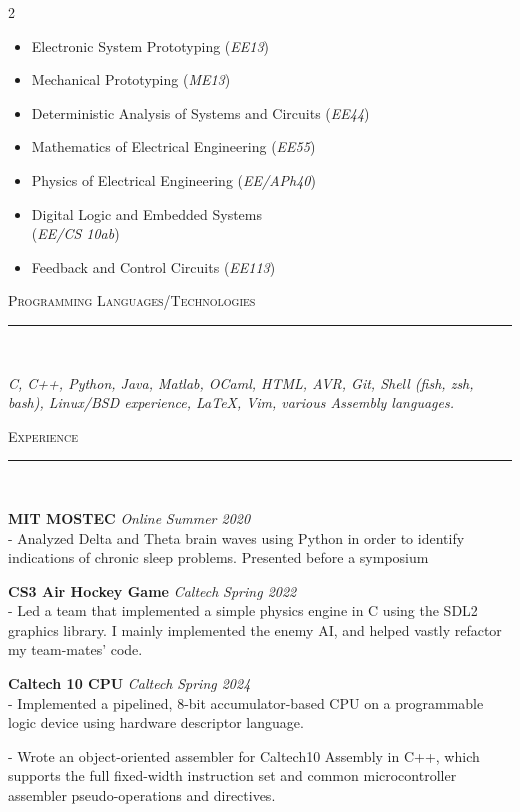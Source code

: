 \documentclass[letterpaper,10pt]{article}
\newcommand{\lineover}{ 
          \begin{changemargin}{-0.05in}{-0.05in} 
                  \vspace*{-8pt} 
                \noindent\rule{\textwidth}{0.4pt} \\ 
                  \vspace*{-2pt} 
        \end{changemargin} 
}
\newenvironment{changemargin}[2]{%
    \begin{list}{}{%
      \setlength{\topsep}{0pt}%
      \setlength{\leftmargin}{0pt}%
      \setlength{\rightmargin}{#2}%
      \setlength{\listparindent}{\parindent}%
      \setlength{\itemindent}{\parindent}%
      \setlength{\parsep}{\parskip}%
    }%
  \item[]}{\end{list} 
}
\newcommand{\header}[1]{ 
          \begin{changemargin}{-0.5in}{-0.5in} 
                  \scshape{#1}\\ 
        \lineover 
        \end{changemargin} 
}
\newcommand{\jobtitle}[4]{ 
          \textbf{#1} \emph{#2} \hfill \emph{#3}\\ 
}
\newcommand{\jobdescription}[1]{ 
          \begin{changemargin}{0.15in}{0.15in} 
      \smallskip 
                  {#1} 
      \medskip 
        \end{changemargin} 
}
\begin{document}
\begin{multicols}{2}
\begin{itemize}
            \item[\ding{104}] Electronic System Prototyping (\textit{EE13})
            \item[\ding{104}] Mechanical Prototyping (\textit{ME13})
            \item[\ding{104}] Deterministic Analysis of Systems and Circuits (\textit{EE44})
            \item[\ding{104}] Mathematics of Electrical Engineering (\textit{EE55}) 
            \item[\ding{104}] Physics of Electrical Engineering (\textit{EE/APh40})
            \item[\ding{104}] Digital Logic and Embedded Systems  \\ (\textit{EE/CS 10ab})
            \item[\ding{104}] Feedback and Control Circuits (\textit{EE113})
            
        \end{itemize}
     \end{multicols}

  \header{Programming Languages/Technologies}
  \emph{C, C++, Python, Java, Matlab, OCaml, HTML, AVR, Git, Shell (fish, zsh, bash), Linux/BSD experience, LaTeX, Vim, various Assembly languages.}

  \vspace{10pt}
  \header{Experience} 
    \medskip
            \jobtitle{MIT MOSTEC}{Online} {Summer 2020} 
            \jobdescription{- Analyzed Delta and Theta brain waves using Python in order to identify indications of chronic sleep problems. Presented before a symposium }
            
            \vspace{4mm}
            
            \jobtitle{CS3 Air Hockey Game}{Caltech} {Spring 2022}
            \jobdescription{- Led a team that implemented a simple physics engine in C using the SDL2 graphics library. I mainly implemented the enemy AI, and helped vastly refactor my team-mates' code.} \\
            
            \vspace{4mm}
            
            \jobtitle{Caltech 10 CPU}{Caltech}{Spring 2024}
            \jobdescription{- Implemented a pipelined, 8-bit accumulator-based CPU on a programmable logic device using hardware descriptor language.}
            \jobdescription{- Wrote an object-oriented assembler for Caltech10 Assembly in C++, which supports the full fixed-width instruction set and common microcontroller assembler pseudo-operations and directives. } 
\end{document}
